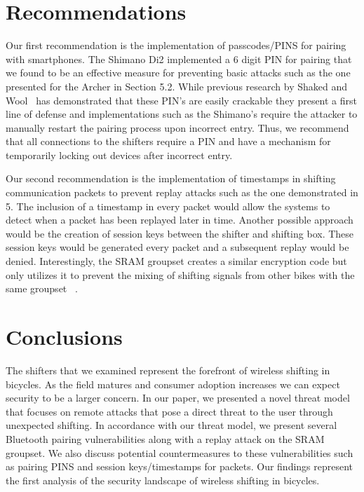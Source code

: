 \documentclass[letterpaper,twocolumn,10pt]{article}
\begin{document}
\section{Recommendations}

Our first recommendation is the implementation of passcodes/PINS for pairing with smartphones. The Shimano Di2 implemented a 6 digit PIN for pairing that we found to be an effective measure for preventing basic attacks such as the one presented for the Archer in Section 5.2. While previous research by Shaked and Wool~ \cite{bluepin} has demonstrated that these PIN’s are easily crackable they present a first line of defense and implementations such as the Shimano’s require the attacker to manually restart the pairing process upon incorrect entry. Thus, we recommend that all connections to the shifters require a PIN and have a mechanism for temporarily locking out devices after incorrect entry.

Our second recommendation is the implementation of timestamps in shifting communication packets to prevent replay attacks such as the one demonstrated in 5. The inclusion of a timestamp in every packet would allow the systems to detect when a packet has been replayed later in time. Another possible approach would be the creation of session keys between the shifter and shifting box. These session keys would be generated every packet and a subsequent replay would be denied. Interestingly, the SRAM groupset creates a similar encryption code but only utilizes it to prevent the mixing of shifting signals from other bikes with the same groupset~ \cite{etapsecure}.


\section{Conclusions}

The shifters that we examined represent the forefront of wireless shifting in bicycles. As the field matures and consumer adoption increases we can expect security to be a larger concern.
In our paper, we presented a novel threat model that focuses on remote attacks that pose a direct threat to the user through unexpected shifting. In accordance with our threat model, we present several Bluetooth pairing vulnerabilities along with a replay attack on the SRAM groupset. We also discuss potential countermeasures to these vulnerabilities such as pairing PINS and session keys/timestamps for packets. Our findings represent the first analysis of the security landscape of wireless shifting in bicycles.
\end{document}
